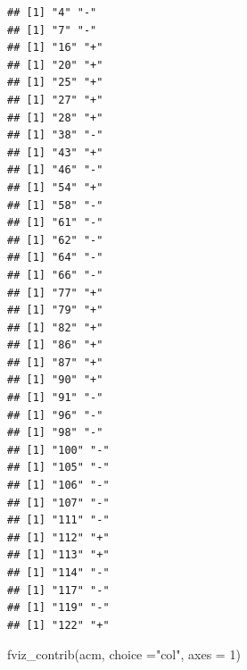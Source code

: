 \documentclass[
]{article}
\newenvironment{Shaded}{\begin{snugshade}}{\end{snugshade}}
\newcommand{\AttributeTok}[1]{\textcolor[rgb]{0.77,0.63,0.00}{#1}}
\newcommand{\ControlFlowTok}[1]{\textcolor[rgb]{0.13,0.29,0.53}{\textbf{#1}}}
\newcommand{\DecValTok}[1]{\textcolor[rgb]{0.00,0.00,0.81}{#1}}
\newcommand{\FunctionTok}[1]{\textcolor[rgb]{0.00,0.00,0.00}{#1}}
\newcommand{\NormalTok}[1]{#1}
\newcommand{\SpecialCharTok}[1]{\textcolor[rgb]{0.00,0.00,0.00}{#1}}
\newcommand{\StringTok}[1]{\textcolor[rgb]{0.31,0.60,0.02}{#1}}
\begin{document}
\begin{Shaded}
\end{Shaded}

\begin{verbatim}
## [1] "4" "-"
## [1] "7" "-"
## [1] "16" "+" 
## [1] "20" "+" 
## [1] "25" "+" 
## [1] "27" "+" 
## [1] "28" "+" 
## [1] "38" "-" 
## [1] "43" "+" 
## [1] "46" "-" 
## [1] "54" "+" 
## [1] "58" "-" 
## [1] "61" "-" 
## [1] "62" "-" 
## [1] "64" "-" 
## [1] "66" "-" 
## [1] "77" "+" 
## [1] "79" "+" 
## [1] "82" "+" 
## [1] "86" "+" 
## [1] "87" "+" 
## [1] "90" "+" 
## [1] "91" "-" 
## [1] "96" "-" 
## [1] "98" "-" 
## [1] "100" "-"  
## [1] "105" "-"  
## [1] "106" "-"  
## [1] "107" "-"  
## [1] "111" "-"  
## [1] "112" "+"  
## [1] "113" "+"  
## [1] "114" "-"  
## [1] "117" "-"  
## [1] "119" "-"  
## [1] "122" "+"
\end{verbatim}

\begin{Shaded}
\begin{Highlighting}[]
\FunctionTok{fviz\_contrib}\NormalTok{(acm, }\AttributeTok{choice =}\StringTok{"col"}\NormalTok{, }\AttributeTok{axes =} \DecValTok{1}\NormalTok{)}
\end{Highlighting}
\end{Shaded}
\end{document}
